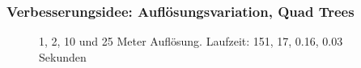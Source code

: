 \documentclass{beamer}
\begin{document}
\begin{frame}
  \frametitle{Verbesserungsidee: Auflösungsvariation, Quad Trees}
  \begin{figure}[h]
    \centering
    \caption{1, 2, 10 und 25 Meter Auflösung. \newline Laufzeit: 151, 17, 0.16, 0.03 Sekunden}
    \label{fig:example}
  \end{figure}
\end{frame}
\end{document}
